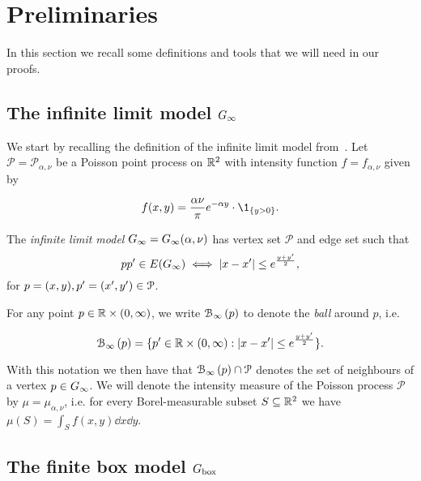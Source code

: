 
\section{Preliminaries\label{sec:proof_outline}}

In this section we recall some definitions and tools that we will need in our proofs.

\subsection{The infinite limit model $G_{\infty}$\label{ssec:infinite_model}}

We start by recalling the definition of the infinite limit model from~\cite{fountoulakis2018law}.
Let $\mathcal{P}=\mathcal{P}_{\alpha,\nu}$ be a Poisson point process on ${\mathbb R}^2$ with intensity function $f=f_{\alpha,\nu}$ given by

\begin{equation}\label{eq:def_intensity_function_f}
	f(x,y) = \frac{\alpha \nu}{\pi} e^{-\alpha y} \cdot \1_{\{y>0\}}.
\end{equation} 

The \emph{infinite limit model} $G_{\infty} = G_{\infty}(\alpha,\nu)$ has vertex set $\mathcal{P}$ and edge set such that
\[
	pp' \in E(G_{\infty}) \iff |x - x'| \leq e^{\frac{y + y'}{2}},
\]
for $p=(x,y),p'=(x',y')\in{\mathcal P}$.

For any point $p \in {\ensuremath{\mathbb R}} \times (0,\infty)$, we write ${\mathcal B}_{\infty}\left(p\right)$ to denote the \emph{ball} around $p$, i.e.

\begin{equation}\label{eq:def_ball_P}
	{\mathcal B}_{\infty}\left(p\right) = \{p^\prime \in {\mathbb R}\times(0,\infty) : |x - x^\prime| \leq e^{\frac{y + y^\prime}{2}}\}.
\end{equation}

With this notation we then have that ${\mathcal B}_{\infty}\left(p\right) \cap {\mathcal P}$ denotes the set of neighbours of a vertex $p \in G_{\infty}$.
We will denote the intensity measure of the Poisson process $\mathcal{P}$ by $\mu = \mu_{\alpha, \nu}$, i.e. for every 
Borel-measurable subset $S \subseteq {\mathbb R}^2$ we have $\mu(S) = \int_S f(x,y) \dd x \dd y$.


\subsection{The finite box model $G_{\mathrm{box}}$\label{ssec:finite_model}}


